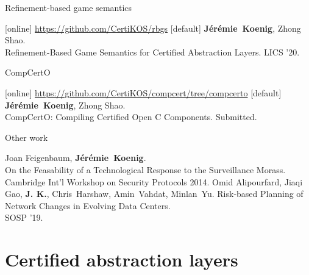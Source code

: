 \documentclass[aspectratio=141]{beamer}
\newcommand{\fme}{\textbf{J\'er\'emie~Koenig}}
\newcommand{\me}{\textbf{J. K.}}
\begin{document}
\begin{frame}{Refinement-based game semantics} %
  \vfill
  \begin{thebibliography}{10}
    [online]
      \url{https://github.com/CertiKOS/rbgs}
    [default]
      \fme, Zhong Shao.
      \newblock \\
      Refinement-Based Game Semantics for Certified Abstraction Layers.
      \newblock
      LICS '20.
  \end{thebibliography}
\end{frame}

\begin{frame}{CompCertO} %
  \vfill
  \begin{thebibliography}{10}
    [online]
      \url{https://github.com/CertiKOS/compcert/tree/compcerto}
    [default]
      \fme, Zhong Shao.
      \newblock \\
      CompCertO: Compiling Certified Open C Components.
      \newblock
      Submitted.
  \end{thebibliography}
\end{frame}

\begin{frame}{Other work} %
  \begin{thebibliography}{10}
      Joan Feigenbaum, \fme.
      \newblock \\
      On the Feasability of
      a Technological Response to the Surveillance Morass.
      \newblock \\
      Cambridge Int'l Workshop on Security Protocols 2014.
      Omid Alipourfard, Jiaqi Gao, \me,
      Chris~Harshaw, Amin~Vahdat, Minlan~Yu.
      \newblock
      Risk-based Planning of Network Changes in Evolving Data Centers.
      \newblock \\
      SOSP '19.
  \end{thebibliography}
\end{frame}


\section{Certified abstraction layers} %
\end{document}
